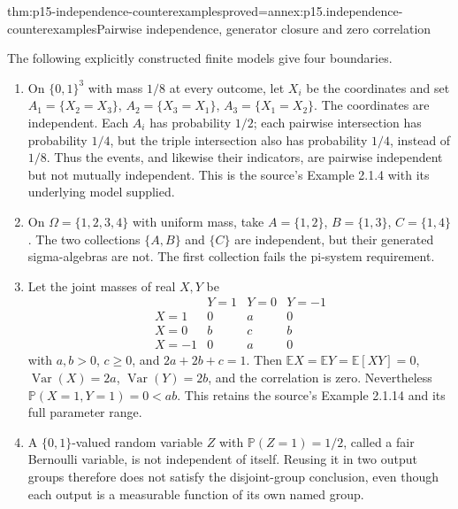 \begin{hbtheorem}{thm:p15-independence-counterexamples}{proved=annex:p15.independence-counterexamples}{Pairwise independence, generator closure and zero correlation}
\par\nobreak
The following explicitly constructed finite models give four boundaries.
\begin{enumerate}
\item On \(\{0,1\}^3\) with mass \(1/8\) at every outcome,
      let \(X_i\) be the coordinates and set
      \(A_1=\{X_2=X_3\}\), \(A_2=\{X_3=X_1\}\),
      \(A_3=\{X_1=X_2\}\). The coordinates are independent.
      Each \(A_i\) has probability \(1/2\); each pairwise
      intersection has probability \(1/4\), but the triple intersection
      also has probability \(1/4\), instead of \(1/8\).
      Thus the events, and likewise their indicators, are pairwise
      independent but not mutually independent. This is the source's
      Example 2.1.4 with its underlying model supplied.
\item On \(\Omega=\{1,2,3,4\}\) with uniform mass, take
      \(A=\{1,2\}\), \(B=\{1,3\}\), \(C=\{1,4\}\).
      The two collections \(\{A,B\}\) and \(\{C\}\) are
      independent, but their generated sigma-algebras are not.
      The first collection fails the pi-system requirement.
\item Let the joint masses of real \(X,Y\) be
      \[
       \begin{array}{c|ccc}
          &Y=1&Y=0&Y=-1\\\hline
        X=1&0&a&0\\
        X=0&b&c&b\\
        X=-1&0&a&0
       \end{array}
      \]
      with \(a,b>0\), \(c\geq0\), and \(2a+2b+c=1\).
      Then \(\mathbb E X=\mathbb E Y=\mathbb E[XY]=0\),
      \(\operatorname{Var}(X)=2a\), \(\operatorname{Var}(Y)=2b\),
      and the correlation is zero. Nevertheless
      \(\mathbb P(X=1,Y=1)=0<ab\).
      This retains the source's Example 2.1.14 and its full parameter range.
\item A \(\{0,1\}\)-valued random variable \(Z\) with
      \(\mathbb P(Z=1)=1/2\), called a fair Bernoulli variable,
      is not independent of itself. Reusing it in two output groups
      therefore does not satisfy the disjoint-group conclusion, even
      though each output is a measurable function of its own named group.
\end{enumerate}
\end{hbtheorem}

